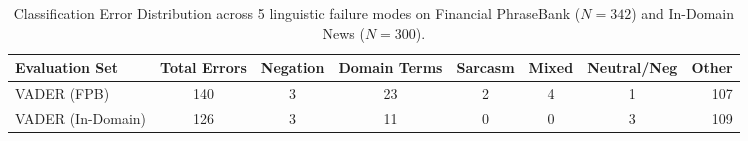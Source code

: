 \begin{table}[t]
\centering
\small
\caption{Classification Error Distribution across 5 linguistic failure modes on Financial PhraseBank ($N=342$) and In-Domain News ($N=300$).}
\label{tab:error_taxonomy}
\begin{tabular}{lccccccr}
\toprule
\textbf{Evaluation Set} & \textbf{Total Errors} & \textbf{Negation} & \textbf{Domain Terms} & \textbf{Sarcasm} & \textbf{Mixed} & \textbf{Neutral/Neg} & \textbf{Other} \\
\midrule
VADER (FPB) & 140 & 3 & 23 & 2 & 4 & 1 & 107 \\
VADER (In-Domain) & 126 & 3 & 11 & 0 & 0 & 3 & 109 \\
\bottomrule
\end{tabular}
\end{table}